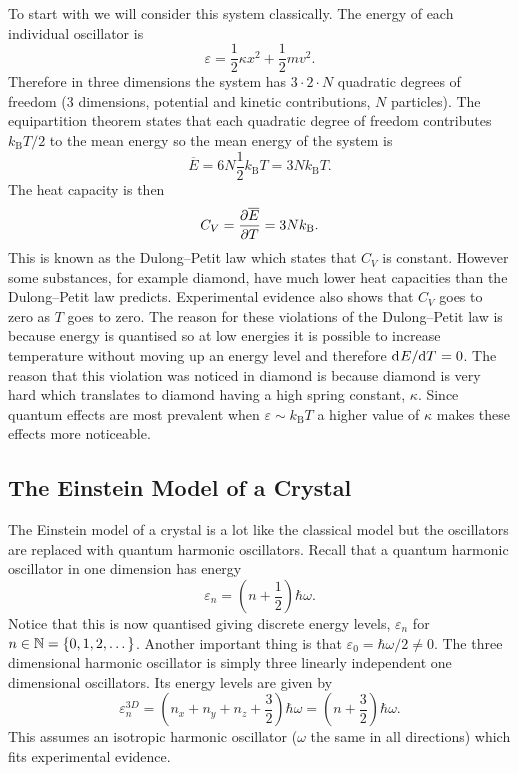 \documentclass[a4paper]{article}
\newcommand{\boltzmann}{k_\mathrm{B}}
\newcommand{\mean}[1]{\overline{#1}}
\begin{document}
    To start with we will consider this system classically.
    The energy of each individual oscillator is
    \[\varepsilon = \frac{1}{2}\kappa x^2 + \frac{1}{2}mv^2.\]
    Therefore in three dimensions the system has \(3\cdot 2\cdot N\)  quadratic degrees of freedom (3 dimensions, potential and kinetic contributions, \(N\) particles).
    The equipartition theorem states that each quadratic degree of freedom contributes \(\boltzmann T/2\) to the mean energy so the mean energy of the system is
    \[\mean{E} = 6N\frac{1}{2}\boltzmann T = 3N\boltzmann T.\]
    The heat capacity is then
    \[C_V = \pdv{\mean{E}}{T} = 3N\boltzmann.\]
    This is known as the Dulong--Petit law which states that \(C_V\) is constant.
    However some substances, for example diamond, have much lower heat capacities than the Dulong--Petit law predicts.
    Experimental evidence also shows that \(C_V\) goes to zero as \(T\) goes to zero.
    The reason for these violations of the Dulong--Petit law is because energy is quantised so at low energies it is possible to increase temperature without moving up an energy level and therefore \(\mathrm{d}^{}{E}/\mathrm{d}{T}^{} = 0\).
    The reason that this violation was noticed in diamond is because diamond is very hard which translates to diamond having a high spring constant, \(\kappa\).
    Since quantum effects are most prevalent when \(\varepsilon \sim \boltzmann T\) a higher value of \(\kappa\) makes these effects more noticeable.
    
    \subsection{The Einstein Model of a Crystal}\label{sec:einstein model of a crystal}
    The Einstein model of a crystal is a lot like the classical model but the oscillators are replaced with quantum harmonic oscillators.
    Recall that a quantum harmonic oscillator in one dimension has energy
    \[\varepsilon_n = \left(n + \frac{1}{2}\right)\hbar\omega.\]
    Notice that this is now quantised giving discrete energy levels, \(\varepsilon_n\) for \(n\in\mathbb{N} = \{0, 1, 2, \dotsc\}\).
    Another important thing is that \(\varepsilon_0 = \hbar\omega/2 \ne 0\).
    The three dimensional harmonic oscillator is simply three linearly independent one dimensional oscillators.
    Its energy levels are given by
    \[\varepsilon^{3D}_n = \left(n_x + n_y + n_z + \frac{3}{2}\right)\hbar\omega = \left(n + \frac{3}{2}\right)\hbar\omega.\]
    This assumes an isotropic harmonic oscillator (\(\omega\) the same in all directions) which fits experimental evidence.
    
\end{document}
